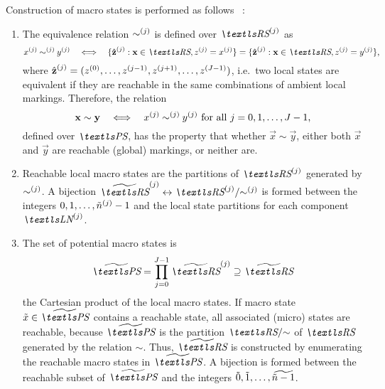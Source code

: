 Construction of macro states is performed as follows%
~\citep{DBLP:journals/tse/Buchholz99}:
\begin{enumerate}
\item The equivalence relation $\sim^{(j)}$ is defined over
  $\loc{\RS}{j}$ as
  \begin{equation}
    \label{eq:genstor:explicit:block:locsim}
    \loc{x}{j} \mathbin{\loc{\sim}{j}} \loc{y}{j}
    \quad\Longleftrightarrow\quad \{ \loc{\hat{\vec{z}}}{j} : \vec{x}
    \in \RS, \loc{z}{j} =
    \loc{x}{j} \} = \{ \loc{\hat{\vec{z}}}{j} : \vec{x} \in \RS, \loc{z}{j} = \loc{y}{j} \}
    \text,
  \end{equation}
  where
  $\hat{\bm{\mathrm{z}}}^{(j)} = (z^{(0)}, \ldots, z^{(j - 1)},
  z^{(j + 1)}, \ldots, z^{(J - 1)})$,
  i.e.~two local states are equivalent if they are reachable in the
  same combinations of ambient local markings. Therefore, the relation
  \begin{equation}
    \bm{\mathrm{x}} \sim \bm{\mathrm{y}} \quad\Longleftrightarrow\quad x^{(j)}
    \mathbin{\sim^{(j)}} y^{(j)} \text{ for all $j = 0, 1,
      \ldots, J - 1$,}
  \end{equation}
  defined over $\PS$, has the property that whether
  $\vec{x} \sim \vec{y}$, either both $\vec{x}$ and $\vec{y}$ are
  reachable (global) markings, or neither are.
\item Reachable local macro states are the partitions of
  $\loc{\RS}{j}$ generated by $\sim^{(j)}$. A bijection
  $\loc{\Macro{\RS}}{j} \leftrightarrow \loc{\RS}{j} / {\loc{\sim}{j}}$
  is formed between the integers
  $0, 1, \ldots, \tilde{n}^{(j)} - 1$ and the local state
  partitions for each component $\LN{j}$.
\item The set of potential macro states is
  \begin{equation}
    \Macro{\PS} = \prod_{j = 0}^{J - 1} \loc{\Macro{\RS}}{j}
    \supseteq \Macro{\RS}
  \end{equation}
  the Cartesian product of the local macro states. If macro state
  $\macro{x} \in \Macro{\PS}$ contains a reachable state, all
  associated (micro) states are reachable, because $\Macro{\PS}$ is
  the partition $\RS / {\sim}$ of $\RS$ generated by the relation
  $\sim$. Thus, $\Macro{\RS}$ is constructed by enumerating the
  reachable macro states in $\Macro{\PS}$. A bijection is formed
  between the reachable subset of $\Macro{\PS}$ and the integers
  $\tilde{0}, \tilde{1}, \ldots, \widetilde{\tilde{n} - 1}$.
\end{enumerate}

